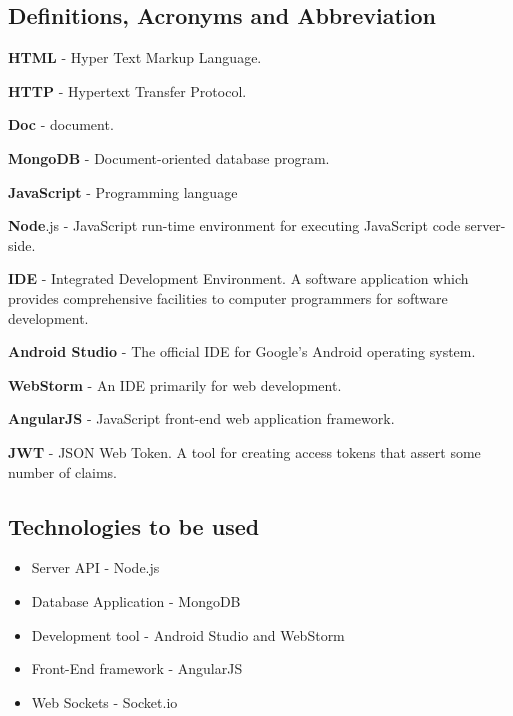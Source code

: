 \documentclass[12pt,a4paper]{article}
\begin{document}
    \subsection{Definitions, Acronyms and
    Abbreviation}\label{section:_Toc146371247}

    \begin{flushleft}

        \textbf{HTML} - Hyper Text Markup Language.

        \textbf{HTTP} - Hypertext Transfer Protocol.

        \textbf{Doc }- document.

        \textbf{MongoDB} - Document-oriented database program.

        \textbf{JavaScript }- Programming language

        \textbf{Node}.js - JavaScript run-time environment for executing
        JavaScript code server-side.

        \textbf{IDE }- Integrated Development Environment. A software
        application which provides comprehensive facilities to computer
        programmers for software development.

        \textbf{Android Studio} - The official IDE for Google's Android
        operating system.

        \textbf{WebStorm} - An IDE primarily for web development.

        \textbf{AngularJS} - JavaScript front-end web application framework.

        \textbf{JWT} - JSON Web Token. A tool for creating access tokens that assert some number of claims.

    \end{flushleft}


    \newpage


    \subsection{Technologies to be used}\label{section:_Toc146371249}


    \begin{itemize}

        \item Server API - Node.js
        \item Database Application - MongoDB
        \item Development tool - Android Studio and WebStorm
        \item Front-End framework - AngularJS
        \item Web Sockets - Socket.io
    \end{itemize}
    \newpage
\end{document}
